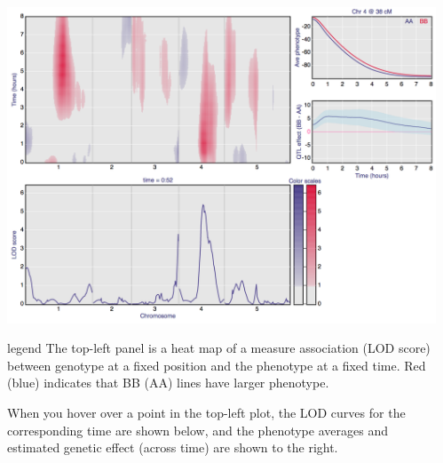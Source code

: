 \documentclass[final,plain]{beamer}
\newlength{\sepwid}
\newlength{\onecolwid}
\begin{document}
\begin{frame}[t]
\begin{columns}[t]
\begin{column}{\onecolwid}
    \centerline{\href{http://www.biostat.wisc.edu/~kbroman/posters/ENAR2014/2b}{\includegraphics[width=\onecolwid]{Figs/2b.png}}}

      \vspace{10mm} %

        \begin{beamercolorbox}[sep=1em, wd=\onecolwid]{legend} \rmfamily
        The top-left panel is a heat map of a measure association (LOD
        score) between genotype at a fixed position and the phenotype
        at a fixed time.  Red (blue) indicates that BB (AA) lines have larger
        phenotype.
 
        \vspace{12pt}

        When you hover over a point in the top-left plot, the LOD curves for the
        corresponding time are shown below, and the phenotype averages and
        estimated genetic effect (across time) are shown to the right.
        \end{beamercolorbox}


  \end{column}

  \begin{column}{\sepwid}\end{column} %

\end{columns}


\end{frame}
\end{document}
